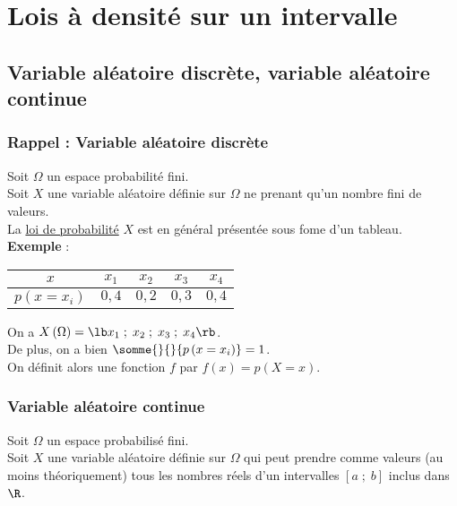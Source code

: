 \section{Lois à densité sur un intervalle}

\subsection{Variable aléatoire discrète, variable aléatoire continue}

\subsubsection{Rappel : Variable aléatoire discrète}

Soit $\Omega$ un espace probabilité fini. \\
Soit $X$ une variable aléatoire définie sur $\Omega$ ne prenant qu'un nombre fini de valeurs. \\

La \underline{loi de probabilité} $X$ est en général présentée sous fome d'un tableau. \\

\textbf{Exemple} : \\

\begin{tabular}{|c|c|c|c|c|}
\hline
$x$ & $x_1$ & $x_2$ & $x_3$ & $x_4$ \\
\hline
$p\left(x=x_i\right)$ & $0,4$ & $0,2$ & $0,3$ & $0,4$ \\
\hline 
\end{tabular}

\vspace*{.7cm}

On a $X\left(\Omega\right) = \lb x_1 \; ; \; x_2 \; ; \; x_3 \; ; \; x_4 \rb$. \\

De plus, on a bien $\somme{}{}{p\left(x=x_i\right)} = 1$. \\

On définit alors une fonction $f$ par $f(x) = p\left(X=x\right)$.

\subsubsection{Variable aléatoire continue}

Soit $\Omega$ un espace probabilisé fini. \\
Soit $X$ une variable aléatoire définie sur $\Omega$ qui peut prendre comme valeurs (au moins théoriquement) tous les nombres réels d'un intervalles $\left[a \; ; \; b\right]$ inclus dans $\R$. \\

